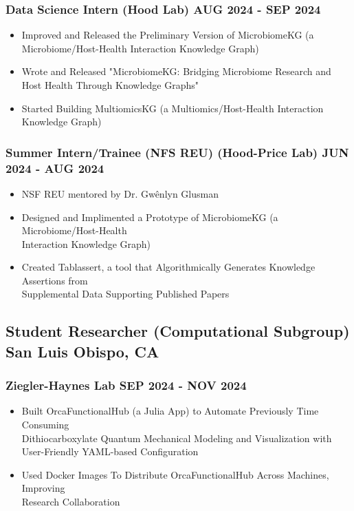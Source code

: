\documentclass[11pt]{article} %
\begin{document}
\subsubsection{Data Science Intern (Hood Lab) \hfill AUG 2024 - SEP 2024}
\begin{itemize}
	\item Improved and Released the Preliminary Version of MicrobiomeKG (a \\ Microbiome/Host-Health Interaction Knowledge Graph)
	\item Wrote and Released "MicrobiomeKG: Bridging Microbiome Research and Host Health Through Knowledge Graphs"
	\item Started Building MultiomicsKG (a Multiomics/Host-Health Interaction Knowledge Graph)
\end{itemize}

\subsubsection{Summer Intern/Trainee (NFS REU) (Hood-Price Lab) \hfill  JUN 2024 - AUG 2024}
\begin{itemize}
	\item NSF REU mentored by Dr. Gwênlyn Glusman
	\item Designed and Implimented a Prototype of MicrobiomeKG (a Microbiome/Host-Health \\ Interaction Knowledge Graph)
	\item Created Tablassert, a tool that Algorithmically Generates Knowledge Assertions from \\ Supplemental Data Supporting Published Papers
\end{itemize}

\subsection{Student Researcher (Computational Subgroup) \hfill San Luis Obispo, CA}
\subsubsection{Ziegler-Haynes Lab \hfill SEP 2024 - NOV 2024}
\begin{itemize}
	\item Built OrcaFunctionalHub (a Julia App) to Automate Previously Time Consuming \\ Dithiocarboxylate Quantum Mechanical Modeling and Visualization with User-Friendly YAML-based Configuration
	\item Used Docker Images To Distribute OrcaFunctionalHub Across Machines, Improving \\ Research Collaboration
\end{itemize}
\end{document}

